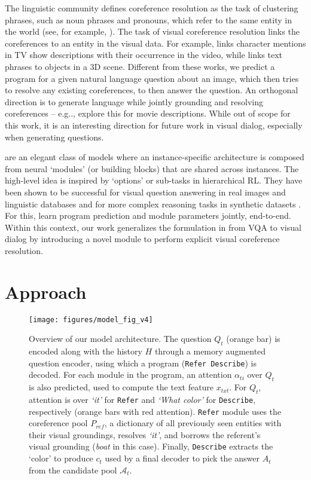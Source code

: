 \documentclass[runningheads]{llncs}
\makeatletter
\DeclareRobustCommand\onedot{\futurelet\@let@token\@onedot}
\def\@onedot{\ifx\@let@token.\else.\null\fi\xspace}
\def\eg{e.g\onedot} \def\Eg{E.g\onedot}
\newcommand{\myparagraph}[1]{\vspace{0pt}\noindent{\bf #1}}
\makeatother
\begin{document}
\myparagraph{Coreference resolution.}
The linguistic community defines coreference resolution as the task of
clustering phrases, such as noun phrases and pronouns, which refer to the same entity in the world (see, for example, \cite{bergsma06acl}). 
The task of visual coreference resolution  links the coreferences to an entity in 
the visual data.
For example, \cite{ramanathan14eccv} links character mentions in TV show 
descriptions with their occurrence in the video,
while \cite{kong14cvpr} links text phrases to objects in a 3D 
scene.
Different from these works, we predict a program for a given natural 
language question about an image, which then tries to resolve any existing 
coreferences, to then answer the question. 
An orthogonal direction is to generate language while jointly grounding and 
resolving coreferences -- \eg, \cite{rohrbach17cvpr} explore this for movie 
descriptions.
While out of scope for this work, it is an interesting direction for future 
work in visual dialog, especially when generating questions.


\myparagraph{Neural Module Networks} \cite{andreas16cvpr}
are an elegant class of models where an instance-specific architecture is 
composed from neural `modules' (or building blocks) that are shared across instances.
The high-level idea is inspired by `options' or sub-tasks in hierarchical RL. 
They have been shown to be successful for visual question answering in real 
images and linguistic databases \cite{andreas_naacl16} and for more complex 
reasoning tasks in synthetic datasets \cite{johnson17iccv,hu2017learning}.
For this, \cite{johnson17iccv,hu2017learning} learn program prediction and 
module parameters jointly, end-to-end.
Within this context, our work generalizes the formulation in 
\cite{hu2017learning} from VQA to visual dialog by introducing a novel module to perform explicit visual coreference resolution. 
\section{Approach}
\label{sec:approach}

\begin{figure}[t]
	\centering
    \texttt{[image: figures/model\_fig\_v4]}
    \caption{
    Overview of our model architecture.
    The question $Q_t$ (orange bar) is encoded along with the history $H$ 
    through a memory augmented question encoder, using which a program 	
    (\texttt{Refer Describe}) is decoded.
    For each module in the program, an attention $\alpha_{ti}$ over $Q_t$ is 
    also predicted, used to compute the text feature $x_{txt}$.
	For $Q_t$, attention is over \textit{`it'} for \texttt{Refer} and 
    \textit{`What color'} for \texttt{Describe}, respectively
  	(orange bars with red attention).
    \texttt{Refer} module uses the coreference pool $P_{ref}$, a dictionary of
    all previously seen entities with their visual groundings,
    resolves \textit{`it'}, and borrows the referent's visual grounding 	
    (\textit{boat} in this case).
    Finally, \texttt{Describe} extracts the `color' to produce $c_t$ used by a 
    final decoder to pick the answer $A_t$ from the candidate pool 
    $\mathcal{A}_t$.
    }
\label{fig:model_fig}
\end{figure}
\end{document}
